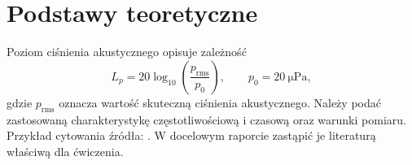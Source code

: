 \section{Podstawy teoretyczne}
\label{sec:teoria}
Poziom ciśnienia akustycznego opisuje zależność
\begin{equation}
  L_p = 20\log_{10}\!\left(\frac{p_{\mathrm{rms}}}{p_0}\right),
  \qquad p_0 = \qty{20}{\micro\pascal},
  \label{eq:lp}
\end{equation}
gdzie $p_{\mathrm{rms}}$ oznacza wartość skuteczną ciśnienia akustycznego.
Należy podać zastosowaną charakterystykę częstotliwościową i czasową
oraz warunki pomiaru. Przykład cytowania źródła: \autocite{lamport1994latex}.
W docelowym raporcie zastąpić je literaturą właściwą dla ćwiczenia.
